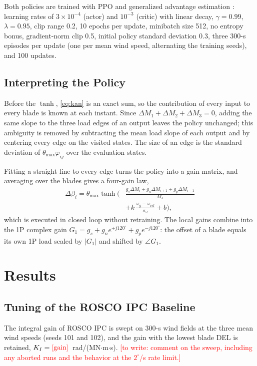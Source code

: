 \documentclass[journal]{IEEEtran}
\newcommand{\pending}[1]{\textcolor{red}{[pending: #1]}}
\newcommand{\todo}[1]{\textcolor{red}{[to write: #1]}}
\newcommand{\pv}[1]{\textcolor{red}{\mbox{[#1]}}}
\newcommand{\inputifexists}[2]{\IfFileExists{#1}{}{\par\noindent\pending{#2}\par}}
\providecommand{\TrainProtocol}{three 300-s episodes per update (one per mean wind speed, alternating
the training seeds), and 100 updates}
\providecommand{\BestIpcGain}{\pv{gain}}
\begin{document}
Both policies are trained with PPO \cite{schulman2017ppo} and generalized advantage estimation
\cite{schulman2016gae}: learning rates of $3\times10^{-4}$ (actor) and $10^{-3}$ (critic) with
linear decay, $\gamma = 0.99$, $\lambda = 0.95$, clip range 0.2, 10 epochs per update, minibatch
size 512, no entropy bonus, gradient-norm clip 0.5, initial policy standard deviation 0.3,
\TrainProtocol.

\subsection{Interpreting the Policy}
Before the $\tanh$, \eqref{eq:kan} is an exact sum, so the contribution of every input to every
blade is known at each instant. Since $\Delta M_1 + \Delta M_2 + \Delta M_3 = 0$, adding the same
slope to the three load edges of an output leaves the policy unchanged; this ambiguity is removed
by subtracting the mean load slope of each output and by centering every edge on the visited
states. The size of an edge is the standard deviation of $\theta_{\max}\varphi_{ij}$ over the
evaluation states.

Fitting a straight line to every edge turns the policy into a gain matrix, and averaging over the
blades gives a four-gain law,
\begin{equation}
\begin{aligned}
\Delta\beta_i = \theta_{\max}\tanh\Big(&\frac{g_s\Delta M_i + g_n\Delta M_{i+1} + g_p\Delta M_{i-1}}{M_s} \\
&+ k\,\frac{\omega_g - \omega_{\mathrm{ref}}}{\sigma_\omega} + b\Big),
\end{aligned}
\label{eq:law}
\end{equation}
which is executed in closed loop without retraining. The local gains combine into the 1P complex
gain $G_1 = g_s + g_n e^{+j120^\circ} + g_p e^{-j120^\circ}$: the offset of a blade equals its own
1P load scaled by $|G_1|$ and shifted by $\angle G_1$.

\section{Results}
\subsection{Tuning of the ROSCO IPC Baseline}
\label{sec:sweep}
The integral gain of ROSCO IPC is swept on 300-s wind fields at the three mean wind speeds
(seeds 101 and 102), and the gain with the lowest blade DEL is retained, $K_I = \BestIpcGain$~rad/(MN$\cdot$m$\cdot$s).
\inputifexists{tables/sweep.tex}{gain sweep table}
\todo{comment on the sweep, including any aborted runs and the behavior at the $2^\circ$/s rate
limit.}
\end{document}

